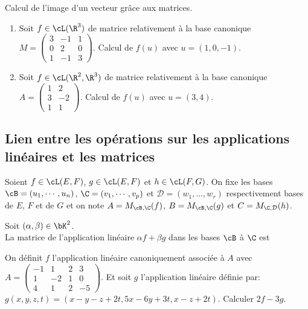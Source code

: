 \documentclass[a4paper, 11pt]{article}
\begin{document}
{\footnotesize \begin{exercice} Calcul de l'image d'un vecteur gr\^ace aux matrices.
\begin{enumerate}
\item Soit $f\in\cL(\R^3)$ de matrice relativement \`a la base canonique $M=\left(\begin{array}{rrr} 3&-1&1\\ 0&2&0\\ 1&-1&3   \end{array}\right)$. Calcul de $f(u)$ avec $u=(1,0,-1)$.
\item Soit $f\in\cL(\R^2,\R^3)$ de matrice relativement \`a la base canonique $A=\left(\begin{array}{rr} 1&2\\ 3&-2\\1&1 \end{array}\right)$. Calcul de $f(u)$ avec $u=(3,4)$.
\end{enumerate}
\end{exercice}
}

\subsection{Lien entre les op\'erations sur les applications lin\'eaires et les matrices}

\noindent Soient $f\in\cL(E,F)$, $g\in\cL(E,F)$ et $h\in\cL(F,G)$. On fixe les bases $\cB=(u_1,\cdots, u_n)$, $\C=(v_1,\cdots, v_p)$ et $\mathcal{D}=(w_1,\dots,w_r)$ respectivement bases de $E$, $F$ et de $G$ et on note $A=M_{\cB,\C}(f)$, $B=M_{\cB,\C}(g)$ et $C=M_{\C,\mathcal{D}}(h)$.
\vspace{0.4cm}



\begin{prop}
Soit $(\alpha,\beta)\in\bK^2$.\vsec\\
\noindent La matrice de l'application lin\'eaire $\alpha f+\beta g$ dans les bases $\cB$ \`a $\C$ est \dotfill \vsec
\end{prop}


{\footnotesize \begin{exercice} On d\'efinit $f$ l'application lin\'eaire canoniquement associ\'ee \`a $A$ avec $A=\left(\begin{array}{rrrr} -1&1&2&3\\ 1&-2&1&0\\ 4&1&2&-5  \end{array}\right)$. Et soit $g$ l'application lin\'eaire d\'efinie par: 
$g(x,y,z,t)=(x-y-z+2t,5x-6y+3t,x-z+2t)$. Calculer $2f-3g$.
\end{exercice}
}
\end{document}
